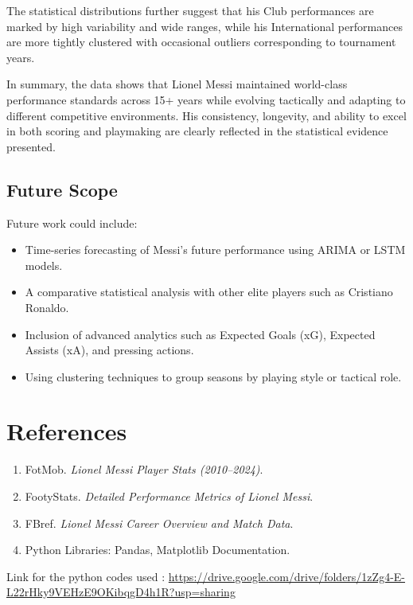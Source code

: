 \documentclass[12pt,a4paper]{report}
\begin{document}
The statistical distributions further suggest that his Club performances are marked by 
high variability and wide ranges, while his International performances are more tightly 
clustered with occasional outliers corresponding to tournament years.

In summary, the data shows that Lionel Messi maintained world-class performance 
standards across 15+ years while evolving tactically and adapting to different 
competitive environments. His consistency, longevity, and ability to excel in both 
scoring and playmaking are clearly reflected in the statistical evidence presented.

\section*{Future Scope}
Future work could include:
\begin{itemize}
    \item Time-series forecasting of Messi’s future performance using ARIMA or LSTM models.
    \item A comparative statistical analysis with other elite players such as Cristiano Ronaldo.
    \item Inclusion of advanced analytics such as Expected Goals (xG), Expected Assists (xA), 
          and pressing actions.
    \item Using clustering techniques to group seasons by playing style or tactical role.
\end{itemize}

\chapter{References}
\begin{enumerate}
    \item FotMob. \textit{Lionel Messi Player Stats (2010–2024)}.  
    \item FootyStats. \textit{Detailed Performance Metrics of Lionel Messi}.  
    \item FBref. \textit{Lionel Messi Career Overview and Match Data}.  
    \item Python Libraries: Pandas, Matplotlib Documentation.  
\end{enumerate}

\appendix
Link for the python codes used : \url{https://drive.google.com/drive/folders/1zZg4-E-L22rHky9VEHzE9OKibqgD4h1R?usp=sharing}
\end{document}

